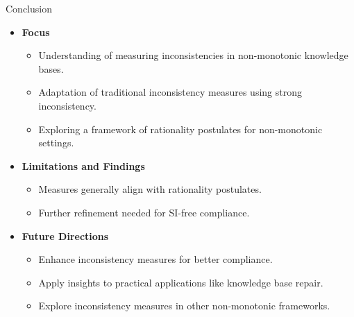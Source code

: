 \begin{frame}{Conclusion}
    \begin{itemize}
        \item \textbf{Focus}
              \begin{itemize}
                  \item Understanding of measuring inconsistencies in non-monotonic knowledge bases.
                  \item Adaptation of traditional inconsistency measures using strong inconsistency.
                  \item Exploring a framework of rationality postulates for non-monotonic settings.
              \end{itemize}
        \item \textbf{Limitations and Findings}
              \begin{itemize}
                  \item Measures generally align with rationality postulates.
                  \item Further refinement needed for SI-free compliance.
              \end{itemize}
        \item \textbf{Future Directions}
              \begin{itemize}
                  \item Enhance inconsistency measures for better compliance.
                  \item Apply insights to practical applications like knowledge base repair.
                  \item Explore inconsistency measures in other non-monotonic frameworks.
              \end{itemize}
    \end{itemize}
\end{frame}
